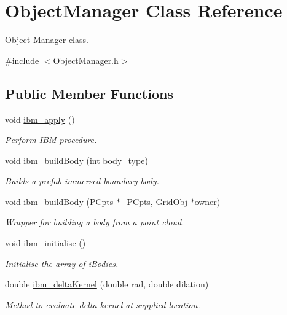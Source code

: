 \hypertarget{class_object_manager}{}\section{Object\+Manager Class Reference}
\label{class_object_manager}


Object Manager class.  




{\ttfamily \#include $<$Object\+Manager.\+h$>$}

\subsection*{Public Member Functions}
\begin{DoxyCompactItemize}
\item 
void \hyperlink{class_object_manager_a2ec2df889c396d94d2fe1807c10847bb}{ibm\+\_\+apply} ()
\begin{DoxyCompactList}\small\item\em Perform I\+BM procedure. \end{DoxyCompactList}\item 
void \hyperlink{class_object_manager_a8bb2de460bc99949775266e3c2369dbe}{ibm\+\_\+build\+Body} (int body\+\_\+type)
\begin{DoxyCompactList}\small\item\em Builds a prefab immersed boundary body. \end{DoxyCompactList}\item 
void \hyperlink{class_object_manager_a0ce3110c9a7f3b55a5b173e09a53010a}{ibm\+\_\+build\+Body} (\hyperlink{class_p_cpts}{P\+Cpts} $\ast$\+\_\+\+P\+Cpts, \hyperlink{class_grid_obj}{Grid\+Obj} $\ast$owner)
\begin{DoxyCompactList}\small\item\em Wrapper for building a body from a point cloud. \end{DoxyCompactList}\item 
void \hyperlink{class_object_manager_aa4e5e286a6fe1d9fcaf393ffed329250}{ibm\+\_\+initialise} ()
\begin{DoxyCompactList}\small\item\em Initialise the array of i\+Bodies. \end{DoxyCompactList}\item 
double \hyperlink{class_object_manager_aa3445d1c1bbebc148b6ed634c89ded80}{ibm\+\_\+delta\+Kernel} (double rad, double dilation)
\begin{DoxyCompactList}\small\item\em Method to evaluate delta kernel at supplied location. \end{DoxyCompactList}\item 

\end{DoxyCompactItemize}
